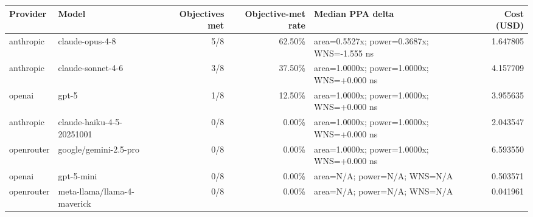 \begin{tabular}{llrrlr}
\toprule
Provider & Model & Objectives met & Objective-met rate & Median PPA delta & Cost (USD) \\
\midrule
anthropic & claude-opus-4-8 & 5/8 & 62.50\% & area=0.5527x; power=0.3687x; WNS=-1.555 ns & 1.647805 \\
anthropic & claude-sonnet-4-6 & 3/8 & 37.50\% & area=1.0000x; power=1.0000x; WNS=+0.000 ns & 4.157709 \\
openai & gpt-5 & 1/8 & 12.50\% & area=1.0000x; power=1.0000x; WNS=+0.000 ns & 3.955635 \\
anthropic & claude-haiku-4-5-20251001 & 0/8 & 0.00\% & area=1.0000x; power=1.0000x; WNS=+0.000 ns & 2.043547 \\
openrouter & google/gemini-2.5-pro & 0/8 & 0.00\% & area=1.0000x; power=1.0000x; WNS=+0.000 ns & 6.593550 \\
openai & gpt-5-mini & 0/8 & 0.00\% & area=N/A; power=N/A; WNS=N/A & 0.503571 \\
openrouter & meta-llama/llama-4-maverick & 0/8 & 0.00\% & area=N/A; power=N/A; WNS=N/A & 0.041961 \\
\bottomrule
\end{tabular}
